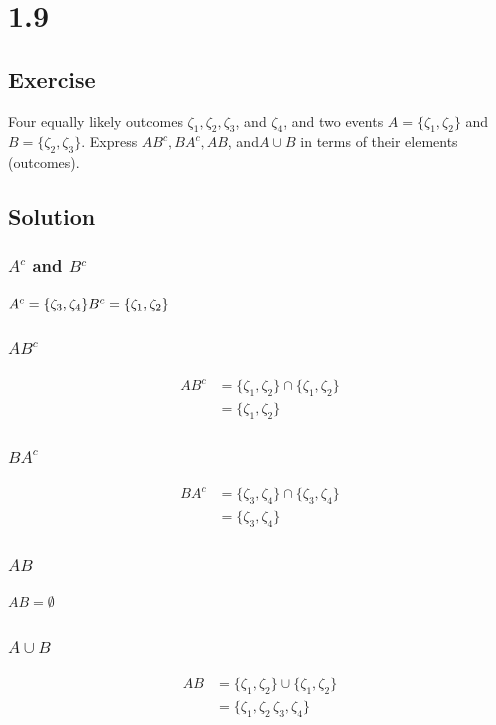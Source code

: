 \documentclass[12pt]{article}
\begin{document}
\section{1.9}
\subsection{Exercise}
Four equally likely outcomes $\zeta_1, \zeta_2, \zeta_3$, and $\zeta_4$, and two 
events $A=\{\zeta_1,\zeta_2\}$ and $B=\{\zeta_2,\zeta_3\}$. Express $AB^c, BA^c, AB$, 
and$ A\cup B$ in terms of their elements (outcomes).

\subsection{Solution}
\subsubsection{$A^c$ and $B^c$}
$A^c =\{\zeta_3, \zeta_4\}\\
B^c = \{\zeta_1, \zeta_2\}$

\subsubsection{$AB^c$}
\begin{align*}
AB^c &= \{\zeta_1, \zeta_2\} \cap \{\zeta_1, \zeta_2\}\\
&= \{\zeta_1, \zeta_2\}
\end{align*}

\subsubsection{$BA^c$}
\begin{align*}
BA^c & = \{\zeta_3, \zeta_4\} \cap \{\zeta_3, \zeta_4\}\\
 &= \{\zeta_3, \zeta_4\}
\end{align*}

\subsubsection{$AB$}
$AB = \emptyset$

\subsubsection{$A \cup B$}
\begin{align*}
AB &= \{\zeta_1, \zeta_2\} \cup \{\zeta_1, \zeta_2\}\\
& = \{\zeta_1, \zeta_2\, \zeta_3, \zeta_4\}
\end{align*}
\end{document}
